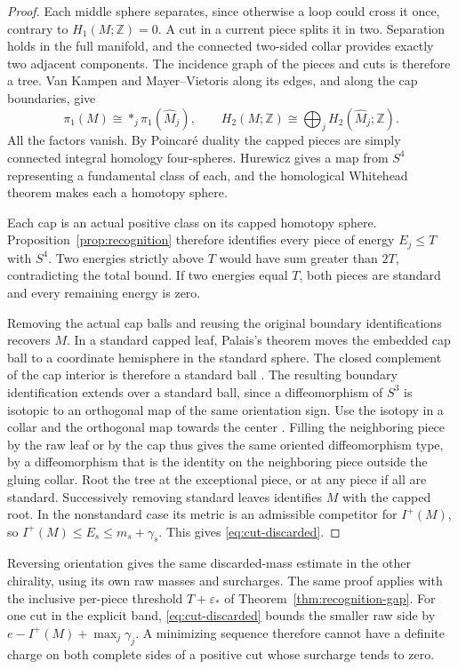 \begin{proof}
Each middle sphere separates, since otherwise a loop could cross it
once, contrary to \(H_1(M;\mathbb Z)=0\). A cut in a current piece
splits it in two. Separation holds in the full manifold, and the
connected two-sided collar provides exactly two adjacent components.
The incidence graph of the pieces and cuts is therefore a tree.
Van Kampen and Mayer--Vietoris along its edges, and along the cap
boundaries, give
\[
 \pi_1(M)\cong *_{j}\pi_1(\widehat M_j),\qquad
 H_2(M;\mathbb Z)\cong\bigoplus_j H_2(\widehat M_j;\mathbb Z).
\]
All the factors vanish. By Poincar\'e duality the capped pieces are
simply connected integral homology four-spheres. Hurewicz gives a
map from \(S^4\) representing a fundamental class of each, and the
homological Whitehead theorem makes each a homotopy sphere.

Each cap is an actual positive class on its capped homotopy sphere.
Proposition~\ref{prop:recognition} therefore identifies every piece of
energy \(E_j\leq T\) with \(S^4\). Two energies strictly above \(T\)
would have sum greater than \(2T\), contradicting the total bound.
If two energies equal \(T\), both pieces are standard and every
remaining energy is zero.

Removing the actual cap balls and reusing the original boundary
identifications recovers \(M\). In a standard capped leaf, Palais's
theorem moves the embedded cap ball to a coordinate hemisphere in
the standard sphere. The closed complement of the cap interior is
therefore a standard ball
\cite[Theorem B]{Palais1960Extending}. The resulting boundary
identification extends over a standard ball, since a diffeomorphism
of \(S^3\) is isotopic to an orthogonal map of the same orientation
sign. Use the isotopy in a collar and the orthogonal map towards
the center \cite[p.~553]{Hatcher1983Smale}. Filling the neighboring
piece by the raw leaf or by the cap thus gives the same oriented
diffeomorphism type, by a diffeomorphism that is the identity on
the neighboring piece outside the gluing collar. Root the tree at
the exceptional piece, or at any piece if all are standard.
Successively removing standard leaves identifies \(M\) with the
capped root. In the nonstandard case its metric is an admissible
competitor for \(I^+(M)\), so
\(I^+(M)\leq E_s\leq m_s+\gamma_s\). This gives
\eqref{eq:cut-discarded}.
\end{proof}

Reversing orientation gives the same discarded-mass estimate in the other chirality, using its own raw masses and surcharges. The same proof applies with the inclusive per-piece threshold
\(T+\varepsilon_*\) of Theorem~\ref{thm:recognition-gap}.
For one cut in the explicit band, \eqref{eq:cut-discarded} bounds
the smaller raw side by \(e-I^+(M)+\max_j\gamma_j\).
A minimizing sequence therefore cannot have a definite charge on
both complete sides of a positive cut whose surcharge tends to zero.


